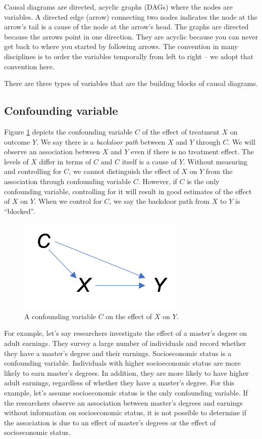 \documentclass[]{book}
\begin{document}
Causal diagrams are directed, acyclic graphs (DAGs) where the nodes are variables. A directed edge (arrow) connecting two nodes indicates the node at the arrow's tail is a cause of the node at the arrow's head. The graphs are directed because the arrows point in one direction. They are acyclic because you can never get back to where you started by following arrows. The convention in many disciplines is to order the variables temporally from left to right -- we adopt that convention here.

There are three types of variables that are the building blocks of causal diagrams.

\hypertarget{confounding-variable}{%
\subsection{Confounding variable}\label{confounding-variable}}

Figure \ref{fig:confounder} depicts the confounding variable \(C\) of the effect of treatment \(X\) on outcome \(Y\). We say there is a \emph{backdoor path} between \(X\) and \(Y\) through \(C\). We will observe an association between \(X\) and \(Y\) even if there is no treatment effect. The levels of \(X\) differ in terms of \(C\) and \(C\) itself is a cause of \(Y\). Without measuring and controlling for \(C\), we cannot distinguish the effect of \(X\) on \(Y\) from the association through confounding variable \(C\). However, if \(C\) is the only confounding variable, controlling for it will result in good estimates of the effect of \(X\) on \(Y\). When we control for \(C\), we say the backdoor path from \(X\) to \(Y\) is ``blocked''.

\begin{figure}
\centering
\includegraphics{./images/confounder.png}
\caption{\label{fig:confounder} A confounding variable \(C\) on the effect of \(X\) on \(Y\).}
\end{figure}

For example, let's say researchers investigate the effect of a master's degree on adult earnings. They survey a large number of individuals and record whether they have a master's degree and their earnings. Socioeconomic status is a confounding variable. Individuals with higher socioeconomic status are more likely to earn master's degrees. In addition, they are more likely to have higher adult earnings, regardless of whether they have a master's degree. For this example, let's assume socioeconomic status is the only confounding variable. If the researchers observe an association between master's degrees and earnings without information on socioeconomic status, it is not possible to determine if the association is due to an effect of master's degrees or the effect of socioeconomic status.
\end{document}
